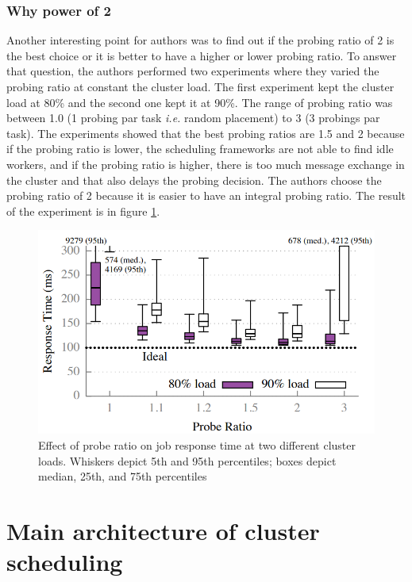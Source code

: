 \documentclass[11pt]{article}
\begin{document}
        
        \subsubsection*{Why power of 2}
        	\label{probingratio}
        
        Another interesting point for authors was to find out if the probing ratio of 2 is the best choice or it is better to have a higher or lower probing ratio. To answer that question, the authors performed two experiments where they varied the probing ratio at constant the cluster load. The first experiment kept the cluster load at 80\% and the second one kept it at 90\%. The range of probing ratio was between 1.0 (1 probing par task \textit{i.e.} random placement) to 3 (3 probings par task). The experiments showed that the best probing ratios are 1.5 and 2 because if the probing ratio is lower, the scheduling frameworks are not able to find idle workers, and if the probing ratio is higher, there is too much message exchange in the cluster and that also delays the probing decision. The authors choose the probing ratio of 2 because it is easier to have an integral probing ratio. The result of the experiment is in figure \ref{fig6}.
        
        \begin{figure}
        		\centering
        		\includegraphics[scale=.35]{fig6}
        		\caption{Effect of probe ratio on job response time at two different cluster loads. Whiskers depict 5th and 95th percentiles; boxes depict median, 25th, and 75th percentiles}
        		\label{fig6}
        \end{figure}


\section{Main architecture of cluster scheduling}
\end{document}
